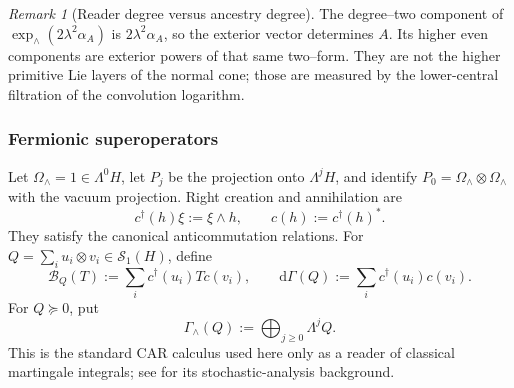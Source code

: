 \documentclass[10pt,reqno]{amsart}
\theoremstyle{plain}
\theoremstyle{definition}
\theoremstyle{remark}
\newtheorem{remark}[theorem]{Remark}
\begin{document}
\begin{remark}[Reader degree versus ancestry degree]
\label{cc:rem-reader-versus-ancestry}
The degree--two component of
\(\exp_{\wedge}(2\lambda^2\alpha_A)\) is
\(2\lambda^2\alpha_A\), so the exterior vector determines \(A\).
Its higher even components are exterior powers of that same two--form.  They
are not the higher primitive Lie layers of the normal cone; those are
measured by the lower-central filtration of the convolution logarithm.
\end{remark}

\subsubsection{Fermionic superoperators}

Let \(\Omega_{\wedge}=1\in\Lambda^0H\), let \(P_j\) be the projection onto
\(\Lambda^jH\), and identify
\(P_0=\Omega_{\wedge}\otimes\Omega_{\wedge}\) with the vacuum projection.
Right creation and annihilation are
\[
 c^{\dagger}(h)\xi:=\xi\wedge h,
 \qquad c(h):=c^{\dagger}(h)^*.
\]
They satisfy the canonical anticommutation relations.  For
\(Q=\sum_i u_i\otimes v_i\in\mathcal S_1(H)\), define
\begin{equation}
 \mathcal B_Q(T):=\sum_i c^{\dagger}(u_i)T c(v_i),
 \qquad
 \mathrm d\Gamma(Q):=\sum_i c^{\dagger}(u_i)c(v_i).
 \label{cc:eq-fermionic-superoperators}
\end{equation}
For \(Q\succeq0\), put
\begin{equation}
 \Gamma_{\wedge}(Q):=\bigoplus_{j\geq0}\Lambda^jQ.
 \label{cc:eq-fermionic-second-quantization}
\end{equation}
This is the standard CAR calculus used here only as a reader of classical
martingale integrals; see
\cite{BarnettStreaterWilde82,ApplebaumHudson84} for its stochastic-analysis
background.
\end{document}
